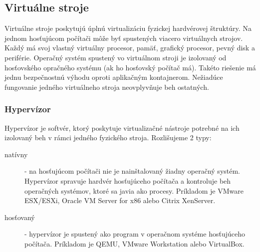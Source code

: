 \documentclass[printed,11pt,twoside,color,cover,table]{fithesis3}
\begin{document}
\subsection{Virtuálne stroje}
Virtuálne stroje poskytujú úplnú virtualizáciu fyzickej hardvérovej štruktúry. Na jednom hosťujúcom počítači môže byť spustených viacero virtuálnych strojov. Každý má svoj vlastný virtuálny procesor, pamäť, grafický procesor, pevný disk 
a periférie. Operačný systém spustený vo virtuálnom stroji je izolovaný od hosťovského opračného systému (ak ho hosťovský počítač má). Takéto riešenie má jednu bezpečnostnú výhodu oproti aplikačným 
kontajnerom. Nežiadúce fungovanie jedného virtuálneho stroja neovplyvňuje beh ostatných.

\subsubsection{Hypervízor}
Hypervízor je softvér, ktorý poskytuje virtualizačné nástroje potrebné na ich izolovaný beh v rámci jedného fyzického stroja. Rozlišujeme 2 typy:
\begin{description}
\item[natívny] - na hosťujúcom počítači nie je nainštalovaný žiadny operačný systém. Hypervízor spravuje hardvér hosťujúceho počítača a kontroluje beh operačných systémov, ktoré sa javia ako procesy.
Príkladom je VMware ESX/ESXi, Oracle VM Server for x86 alebo Citrix XenServer.
\item[hosťovaný] - hypervízor je spustený ako program v operačnom systéme hosťujúceho počítača. Príkladom je QEMU, VMware Workstation alebo VirtualBox.
\end{description}
\cite{hypervisorTypes}
\end{document}
